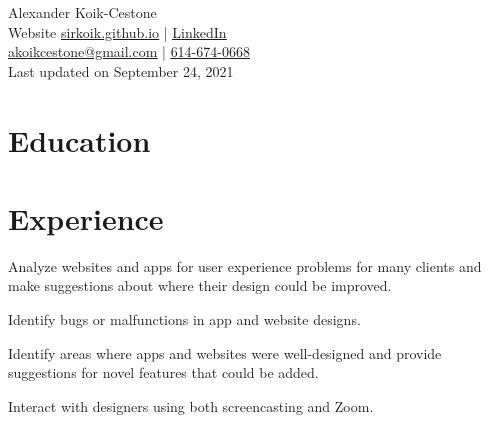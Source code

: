 \documentclass[]{deedy-resume-openfont}
\begin{document}
%
%

%
%


\begin{center}
{\Huge Alexander Koik-Cestone} \\
Website \href{https://sirkoik.github.io}{\underline{sirkoik.github.io}} | 
\href{https://www.linkedin.com/in/alexander-koik-cestone-89304556/}{\underline{LinkedIn}} \\
\href{mailto:akoikcestone@gmail.com}{\underline{akoikcestone@gmail.com}} |  \href{tel:614-674-0668}{\underline{614-674-0668}} \\
Last updated on September 24, 2021
\end{center}




\sectionsep
{}
\sectionsep

\section{Education}
\sectionsep

\sectionsep

\section{Experience}

\begin{tightemize}
\item Analyze websites and apps for user experience problems for many clients and make suggestions about where their design could be improved.
\item Identify bugs or malfunctions in app and website designs.
\item Identify areas where apps and websites were well-designed and provide suggestions for novel features that could be added.
\item Interact with designers using both screencasting and Zoom.
\end{tightemize}
\sectionsep
\end{document}
